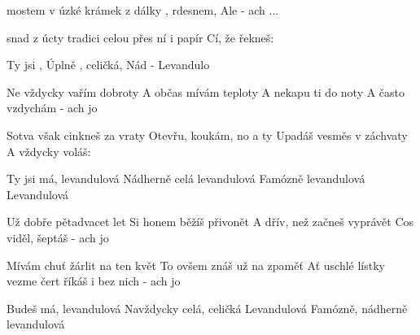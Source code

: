
\zs

 mostem v úzké 
 krámek z dálky 
, rdesnem, 
Ale  - ach  ...

\ks
\zs

 snad z úcty  tradici
 celou 
 přes ní i papír 
Cí, že řekneš: 

\ks
\zr

Ty jsi ,   
Úplně , celičká,  
Nád 
  - Levandulo

\kr
\zs

Ne vždycky vařím dobroty
A občas mívám teploty
A nekapu ti do noty
A často vzdychám - ach jo

\ks
\zs

Sotva však cinkneš za vraty
Otevřu, koukám, no a ty
Upadáš vesměs v záchvaty
A vždycky voláš:

\ks
\zr

Ty jsi má, levandulová
Nádherně celá levandulová
Famózně levandulová
Levandulová

\kr
\zs

Už dobře pětadvacet let
Si honem běžíš přivonět
A dřív, než začneš vyprávět
Cos viděl, šeptáš - ach jo

\ks
\zs

Mívám chuť žárlit na ten květ
To ovšem znáš už na zpaměť
Ať uschlé lístky vezme čert
říkáš i bez nich - ach jo

\ks
\zr

Budeš má, levandulová
Navždycky celá, celičká
Levandulová
Famózně, nádherně levandulová

\kr
\kp






